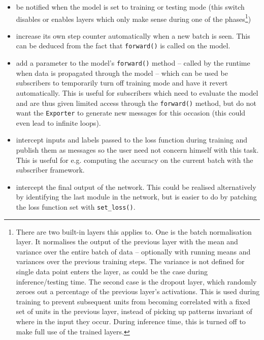 \begin{itemize}
    \item
        be notified when the model is set to training or testing mode (this
        switch disables or enables layers which only make sense during one of
        the phases\footnote{There are two built-in layers this applies to. One
            is the batch normalisation layer. It normalises the output of the
            previous layer with the mean and variance over the entire batch of
            data -- optionally with running means and variances over the
            previous training steps. The variance is not defined for
            single data point enters the layer, as could be the case during
            inference/testing time. The second case is the dropout layer, which
            randomly zeroes out a percentage of the previous layer's
            activations. This is used during training to prevent subsequent
            units from becoming correlated with a fixed set of units in the
            previous layer, instead of picking up patterns invariant of where in
            the input they occur. During inference time, this is turned off to
            make full use of the trained
        layers.})
    \item
        increase its own step counter automatically when a new batch is seen.
        This can be deduced from the fact that \lstinline+forward()+ is called
        on the model.
    \item
        add a parameter to the model's \lstinline{forward()} method -- called by
        the runtime when data is propagated through the model -- which can be
        used be subscribers to temporarily turn off training mode and have it
        revert automatically. This is useful for subscribers which need to
        evaluate the model and are thus given limited access through the
        \lstinline+forward()+ method, but do not want the \lstinline+Exporter+
        to generate new messages for this occasion (this could even lead to
        infinite loops).
    \item
        intercept inputs and labels passed to the loss function during training and
        publish them as messages so the user need not concern himself with
        this task. This is useful for e.g. computing the accuracy on the current
        batch with the subscriber framework.
    \item
        intercept the final output of the network. This could be realised
        alternatively by identifying the last module in the network, but is
        easier to do by patching the loss function set with
        \lstinline+set_loss()+.
\end{itemize}


